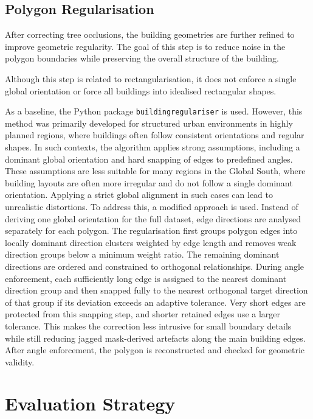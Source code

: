 \subsection{Polygon Regularisation}
\label{sec:rectangularization}

After correcting tree occlusions, the building geometries are further refined to improve geometric regularity. The goal of this step is to reduce noise in the polygon boundaries while preserving the overall structure of the building.

Although this step is related to rectangularisation, it does not enforce a single global orientation or force all buildings into idealised rectangular shapes.

As a baseline, the Python package \texttt{buildingregulariser} \citep{buildingregulariser} is used. However, this method was primarily developed for structured urban environments in highly planned regions, where buildings often follow consistent orientations and regular shapes. In such contexts, the algorithm applies strong assumptions, including a dominant global orientation and hard snapping of edges to predefined angles. These assumptions are less suitable for many regions in the Global South, where building layouts are often more irregular and do not follow a single dominant orientation. Applying a strict global alignment in such cases can lead to unrealistic distortions. To address this, a modified approach is used. Instead of deriving one global orientation for the full dataset, edge directions are analysed separately for each polygon. The regularisation first groups polygon edges into locally dominant direction clusters weighted by edge length and removes weak direction groups below a minimum weight ratio. The remaining dominant directions are ordered and constrained to orthogonal relationships. During angle enforcement, each sufficiently long edge is assigned to the nearest dominant direction group and then snapped fully to the nearest orthogonal target direction of that group if its deviation exceeds an adaptive tolerance. Very short edges are protected from this snapping step, and shorter retained edges use a larger tolerance. This makes the correction less intrusive for small boundary details while still reducing jagged mask-derived artefacts along the main building edges. After angle enforcement, the polygon is reconstructed and checked for geometric validity.

\section{Evaluation Strategy}
\label{sec:evaluation_strategy}

